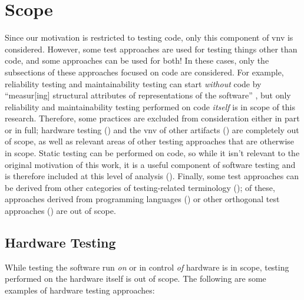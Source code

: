 \section{Scope}
\label{scope}

Since our motivation is restricted to testing code, only this component of
\acf{vnv} is considered. However, some test approaches
are used for testing things other than code, and some approaches can be used
for both! In these cases, only the subsections of these approaches focused on
code are considered. For example, reliability testing and maintainability
testing can start \emph{without} code by ``measur[ing] structural attributes
of representations of the software'' \citep[p.~18]{FentonAndPfleeger1997}, but
only reliability and maintainability testing performed on code \emph{itself} is
in scope of this research. Therefore, some practices are excluded from
consideration either in part or in full; hardware testing ()
and the \acs{vnv} of other artifacts ()
are completely out of scope, as well as relevant areas of other testing
approaches that are otherwise in scope. Static testing can be performed
on code, so while it isn't relevant to the original motivation of this work, it
is a useful component of software testing and is therefore included at this level
of analysis (). \ifnotpaper Finally, some test approaches can
    be derived from other categories of testing-related terminology
    (); of these, approaches derived from programming
    languages () or other orthogonal test approaches
    () are out of scope. \fi

\subsection{Hardware Testing}
\label{hard-test}
While testing the software run \emph{on} or in control \emph{of} hardware is in
scope, testing performed on the hardware itself is out of scope. The following
are some examples of hardware testing approaches:

